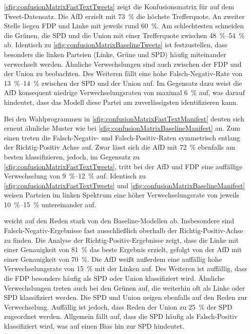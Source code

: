 \autoref{sfig:confusionMatrixFastTextTweets} zeigt die Konfusionsmatrix für \ft auf dem Tweet-Datensatz. Die \ac{AfD} erzielt mit \SI{73}{\percent} die höchste Trefferquote. An zweiter Stelle liegen \ac{FDP} und Linke mit jeweils rund \SI{60}{\percent}. Am schlechtesten schneiden die Grünen, die \ac{SPD} und die Union mit einer Trefferquote zwischen \SIrange{48}{54}{\percent} ab. Identisch zu \autoref{sfig:confusionMatrixBaselineTweets} ist festzustellen, dass besonders die linken Parteien (Linke, Grüne und \ac{SPD}) häufig miteinander verwechselt werden. Ähnliche Verwechslungen sind auch zwischen der \ac{FDP} und der Union zu beobachten. Des Weiteren fällt eine hohe Falsch-Negativ-Rate von \SIrange{13}{14}{\percent} zwischen der \ac{SPD} und der Union auf. Im Gegensatz dazu weist die \ac{AfD} konsequent niedrige Verwechselungsraten von maximal \SI{6}{\percent} auf, was darauf hindeutet, dass das Modell diese Partei am zuverlässigsten identifizieren kann.

Bei den Wahlprogrammen in \autoref{sfig:confusionMatrixFastTextManifest} deuten sich erneut ähnliche Muster wie bei \autoref{sfig:confusionMatrixBaselineManifest} an. Zum einen treten die Falsch-Negativ- und Falsch-Positiv-Raten symmetrisch entlang der Richtig-Positiv Achse auf. Zwar lässt sich die \ac{AfD} mit \SI{72}{\percent} ebenfalls am besten klassifizieren, jedoch, im Gegensatz zu \autoref{sfig:confusionMatrixFastTextTweets}, tritt bei der \ac{AfD} und \ac{FDP} eine auffällige Verwechselung von \SIrange{9}{12}{\percent} auf. Identisch zu \autoref{sfig:confusionMatrixFastTextTweets} und \autoref{sfig:confusionMatrixBaselineManifest} weisen Parteien im linken Spektrum eine höher Verwechselungsrate von jeweils \SIrange{10}{15}{\percent} untereinander auf.

\ft weicht auf den Reden stark von den Baseline-Modellen ab. Insbesondere sind Falsch-Negativ-Ergebnisse fast ausschließlich oberhalb der Richtig-Positiv-Achse zu finden. Die Analyse der Richtig-Positiv-Ergebnisse zeigt, dass die Linke mit einer Genauigkeit von \SI{81}{\percent} das beste Ergebnis erzielt, gefolgt von der \ac{AfD} mit einer Genauigkeit von \SI{70}{\percent}. Die \ac{AfD} weißt außerdem eine auffällig hohe Verwechselungsrate von \SI{15}{\percent} mit der Linken auf. Des Weiteren ist auffällig, dass die \ac{FDP} besonders häufig als \ac{SPD} oder Union klassifiziert wird. Ähnliche Verwechslungen treten auch bei den Grünen auf, die weiterhin oft als Linke oder \ac{SPD} klassifiziert werden. Die \ac{SPD} und Union neigen ebenfalls auf den Reden zur Verwechselung. Auffällig ist jedoch, dass Reden der Union zu \SI{25}{\percent} der \ac{SPD} zugeordnet werden. Allgemein fällt auf, dass die \ac{SPD} häufig als Falsch-Positiv klassifiziert wird, was auf einen Bias hin zur \ac{SPD} hindeutet.

